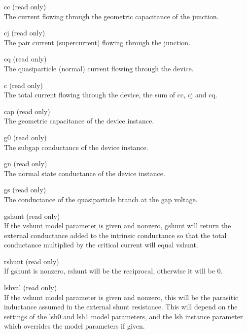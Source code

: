 \begin{description}
\item{\vt cc} (read only)\\
The current flowing through the geometric capacitance of the junction.

\item{\vt cj} (read only)\\
The pair current (supercurrent) flowing through the junction.

\item{\vt cq} (read only)\\
The quasiparticle (normal) current flowing through the device.

\item{\vt c} (read only)\\
The total current flowing through the device, the sum of {\vt cc},
{\vt cj} and {\vt cq}.

\item{\vt cap} (read only)\\
The geometric capacitance of the device instance.

\item{\vt g0} (read only)\\
The subgap conductance of the device instance.

\item{\vt gn} (read only)\\
The normal state conductance of the device instance.

\item{\vt gs} (read only)\\
The conductance of the quasiparticle branch at the gap voltage.

\item{\vt gshunt} (read only)\\
If the {\vt vshunt} model parameter is given and nonzero,
{\vt gshunt} will return the external conductance added to the
intrinsic conductance so that the total conductance multiplied
by the critical current will equal {\vt vshunt}.

\item{\vt rshunt} (read only)\\
If {\vt gshunt} is nonzero, {\vt rshunt} will be the reciprocal,
otherwise it will be 0.

\item{\vt lshval} (read only)\\
If the {\vt vshunt} model parameter is given and nonzero, this will be
the parasitic inductance assumed in the external shunt resistance. 
This will depend on the settings of the {\vt lsh0} and {\vt lsh1}
model parameters, and the {\vt lsh} instance parameter which overrides
the model parameters if given.


\end{description}
